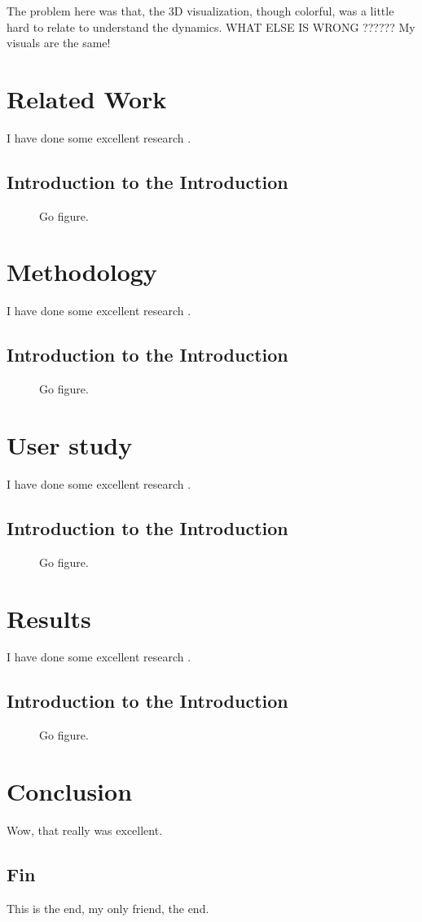 \documentclass[double,12pt]{beavtex}
\begin{document}
The problem here was that, the 3D visualization, though colorful, was a little hard to relate to understand the dynamics. WHAT ELSE IS WRONG ?????? My visuals are the same!


\chapter{Related Work}
I have done some excellent research \cite{matrix}.
\section{Introduction to the Introduction}
\begin{figure}[!ht]
\centering
{}
\caption{Go figure.}
\end{figure}

\chapter{Methodology}
I have done some excellent research \cite{matrix}.
\section{Introduction to the Introduction}
\begin{figure}[!ht]
\centering
{}
\caption{Go figure.}
\end{figure}

\chapter{User study}
I have done some excellent research \cite{matrix}.
\section{Introduction to the Introduction}
\begin{figure}[!ht]
\centering
{}
\caption{Go figure.}
\end{figure}

\chapter{Results}
I have done some excellent research \cite{matrix}.
\section{Introduction to the Introduction}
\begin{figure}[!ht]
\centering
{}
\caption{Go figure.}
\end{figure}

\chapter{Conclusion}
Wow, that really was excellent.
\section{Fin}
This is the end, my only friend, the end.




\end{document}
